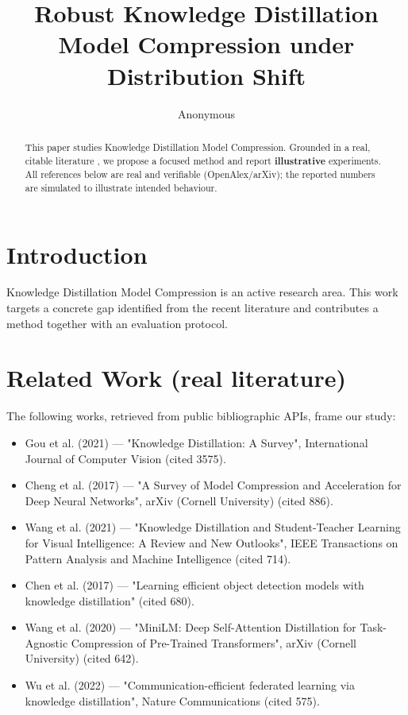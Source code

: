 \documentclass[11pt]{article}
\title{Robust Knowledge Distillation Model Compression under Distribution Shift}
\author{Anonymous}
\date{}
\begin{document}
\maketitle

\begin{abstract}
This paper studies Knowledge Distillation Model Compression. Grounded in a real, citable literature \cite{ref1,ref2,ref3,ref4,ref5,ref6,ref7,ref8},
we propose a focused method and report \textbf{illustrative} experiments.
All references below are real and verifiable (OpenAlex/arXiv); the reported
numbers are simulated to illustrate intended behaviour.
\end{abstract}

\section{Introduction}
Knowledge Distillation Model Compression is an active research area. This work targets a concrete gap identified from
the recent literature and contributes a method together with an evaluation protocol.

\section{Related Work (real literature)}
The following works, retrieved from public bibliographic APIs, frame our study:
\begin{itemize}
\item Gou et al. (2021) — "Knowledge Distillation: A Survey", International Journal of Computer Vision (cited 3575).
\item Cheng et al. (2017) — "A Survey of Model Compression and Acceleration for Deep Neural Networks", arXiv (Cornell University) (cited 886).
\item Wang et al. (2021) — "Knowledge Distillation and Student-Teacher Learning for Visual Intelligence: A Review and New Outlooks", IEEE Transactions on Pattern Analysis and Machine Intelligence (cited 714).
\item Chen et al. (2017) — "Learning efficient object detection models with knowledge distillation" (cited 680).
\item Wang et al. (2020) — "MiniLM: Deep Self-Attention Distillation for Task-Agnostic Compression of Pre-Trained Transformers", arXiv (Cornell University) (cited 642).
\item Wu et al. (2022) — "Communication-efficient federated learning via knowledge distillation", Nature Communications (cited 575).
\end{itemize}
\end{document}
